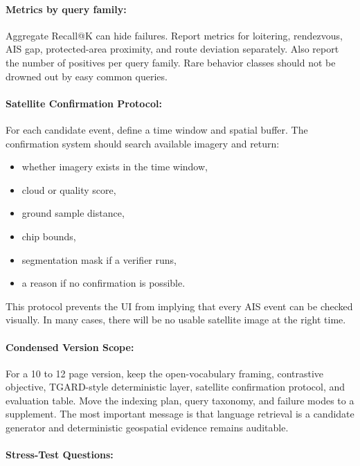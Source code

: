 \documentclass{article}
\begin{document}
\paragraph{Metrics by query family:}

Aggregate Recall@K can hide failures. Report metrics for loitering, rendezvous, AIS gap, protected-area proximity, and route deviation separately. Also report the number of positives per query family. Rare behavior classes should not be drowned out by easy common queries.

\paragraph{Satellite Confirmation Protocol:}

For each candidate event, define a time window and spatial buffer. The confirmation system should search available imagery and return:
\begin{itemize}
  \item whether imagery exists in the time window,
  \item cloud or quality score,
  \item ground sample distance,
  \item chip bounds,
  \item segmentation mask if a verifier runs,
  \item a reason if no confirmation is possible.
\end{itemize}
This protocol prevents the UI from implying that every AIS event can be checked visually. In many cases, there will be no usable satellite image at the right time.

\paragraph{Condensed Version Scope:}

For a 10 to 12 page version, keep the open-vocabulary framing, contrastive objective, TGARD-style deterministic layer, satellite confirmation protocol, and evaluation table. Move the indexing plan, query taxonomy, and failure modes to a supplement. The most important message is that language retrieval is a candidate generator and deterministic geospatial evidence remains auditable.

\paragraph{Stress-Test Questions:}
\end{document}
